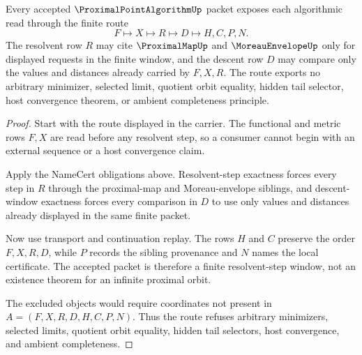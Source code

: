 \begin{theorem}
\label{thm:proximal-point-algorithm-resolvent-step-window}
Every accepted $\ProximalPointAlgorithmUp$ packet exposes each algorithmic read through the finite route
$$
F \longmapsto X \longmapsto R \longmapsto D \longmapsto H,C,P,N.
$$
The resolvent row $R$ may cite $\ProximalMapUp$ and $\MoreauEnvelopeUp$ only for displayed requests in the finite window, and the descent row $D$ may compare only the values and distances already carried by $F,X,R$. The route exports no arbitrary minimizer, selected limit, quotient orbit equality, hidden tail selector, host convergence theorem, or ambient completeness principle.
\end{theorem}
\begin{proof}
Start with the route displayed in the carrier. The functional and metric rows $F,X$ are read before any resolvent step, so a consumer cannot begin with an external sequence or a host convergence claim.

Apply the NameCert obligations above. Resolvent-step exactness forces every step in $R$ through the proximal-map and Moreau-envelope siblings, and descent-window exactness forces every comparison in $D$ to use only values and distances already displayed in the same finite packet.

Now use transport and continuation replay. The rows $H$ and $C$ preserve the order $F,X,R,D$, while $P$ records the sibling provenance and $N$ names the local certificate. The accepted packet is therefore a finite resolvent-step window, not an existence theorem for an infinite proximal orbit.

The excluded objects would require coordinates not present in $A=(F,X,R,D,H,C,P,N)$. Thus the route refuses arbitrary minimizers, selected limits, quotient orbit equality, hidden tail selectors, host convergence, and ambient completeness.
\end{proof}



